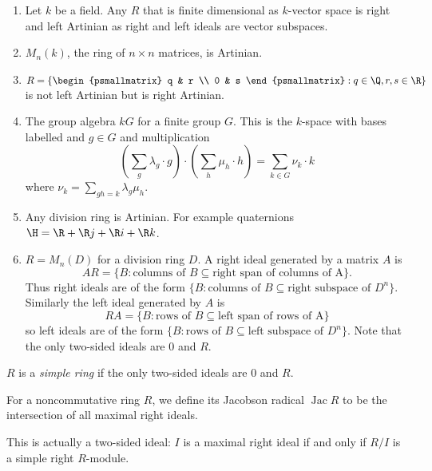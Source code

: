 \documentclass[a4paper]{article}
\DeclareMathOperator{\jac}{Jac} %
\begin{document}
\begin{eg}\leavevmode
  \begin{enumerate}
  \item Let \(k\) be a field. Any \(R\) that is finite dimensional as \(k\)-vector space is right and left Artinian as right and left ideals are vector subspaces.
  \item \(M_n(k)\), the ring of \(n \times n\) matrices, is Artinian.
  \item \(R = \{
    \begin{psmallmatrix}
      q & r \\
      0 & s
    \end{psmallmatrix}
    : q \in \Q, r, s \in \R\}\) is not left Artinian but is right Artinian.
  \item The group algebra \(k G\) for a finite group \(G\). This is the \(k\)-space with bases labelled and \(g \in G\) and multiplication
    \[
      (\sum_g \lambda_g \cdot g) \cdot (\sum_h \mu_h \cdot h) = \sum_{k \in G} \nu_k \cdot k
    \]
    where \(\nu_k = \sum_{gh = k} \lambda_g \mu_h\).
  \item Any division ring is Artinian. For example quaternions \(\H = \R + \R j + \R i + \R k\).
  \item \(R = M_n(D)\) for a division ring \(D\). A right ideal generated by a matrix \(A\) is
    \[
      AR = \{B: \text{columns of } B \subseteq \text{right span of columns of A}\}.
    \]
    Thus right ideals are of the form \(\{B: \text{columns of } B \subseteq \text{right subspace of } D^n\}\). Similarly the left ideal generated by \(A\) is
    \[
      RA = \{B: \text{rows of } B \subseteq \text{left span of rows of A}\}
    \]
    so left ideals are of the form \(\{B: \text{rows of } B \subseteq \text{left subspace of } D^n\}\). Note that the only two-sided ideals are \(0\) and \(R\).
  \end{enumerate}
\end{eg}

\begin{definition}
  \(R\) is a \emph{simple ring} if the only two-sided ideals are \(0\) and \(R\).
\end{definition}

For a noncommutative ring \(R\), we define its Jacobson radical \(\jac R\) to be the intersection of all maximal right ideals.

\begin{remark}
  This is actually a two-sided ideal: \(I\) is a maximal right ideal if and only if \(R/I\) is a simple right \(R\)-module.
\end{remark}
\end{document}
